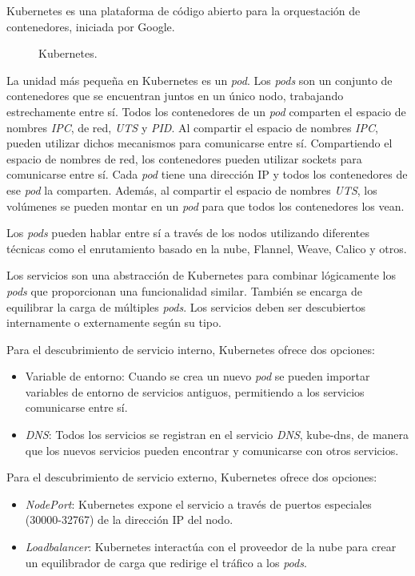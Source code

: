 Kubernetes es una plataforma de código abierto para la orquestación de contenedores, iniciada por Google.

\begin{figure}[H]
\caption{Kubernetes.\label{fig:figure_placement_example}}
\end{figure}

La unidad más pequeña en Kubernetes es un \textit{pod}. Los \textit{pods} son un conjunto de contenedores que se encuentran juntos en un único nodo, trabajando estrechamente entre sí. Todos los contenedores de un \textit{pod} comparten el espacio de nombres \textit{IPC}, de red, \textit{UTS} y \textit{PID}. Al compartir el espacio de nombres \textit{IPC}, pueden utilizar dichos mecanismos para comunicarse entre sí. Compartiendo el espacio de nombres de red, los contenedores pueden utilizar sockets para comunicarse entre sí. Cada \textit{pod} tiene una dirección IP y todos los contenedores de ese \textit{pod} la comparten. Además, al compartir el espacio de nombres \textit{UTS}, los volúmenes se pueden montar en un \textit{pod} para que todos los contenedores los vean.

Los \textit{pods} pueden hablar entre sí a través de los nodos utilizando diferentes técnicas como el enrutamiento basado en la nube, Flannel, Weave, Calico y otros.

Los servicios son una abstracción de Kubernetes para combinar lógicamente los \textit{pods} que proporcionan una funcionalidad similar. También se encarga de equilibrar la carga de múltiples \textit{pods}. Los servicios deben ser descubiertos internamente o externamente según su tipo.

Para el descubrimiento de servicio interno, Kubernetes ofrece dos opciones:
\begin{itemize}
\item Variable de entorno: Cuando se crea un nuevo \textit{pod} se pueden importar variables de entorno de servicios antiguos, permitiendo a los servicios comunicarse entre sí.
\item \textit{DNS}: Todos los servicios se registran en el servicio \textit{DNS}, kube-dns, de manera que los nuevos servicios pueden encontrar y comunicarse con otros servicios.
\end{itemize}

Para el descubrimiento de servicio externo, Kubernetes ofrece dos opciones:
\begin{itemize}
\item \textit{NodePort}: Kubernetes expone el servicio a través de puertos especiales (30000-32767) de la dirección IP del nodo.
\item \textit{Loadbalancer}: Kubernetes interactúa con el proveedor de la nube para crear un equilibrador de carga que redirige el tráfico a los \textit{pods}.
\end{itemize}

